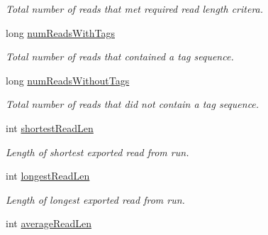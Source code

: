 \begin{DoxyCompactItemize}
\begin{DoxyCompactList}\small\item\em Total number of reads that met required read length critera. \end{DoxyCompactList}\item 
\hypertarget{structTorrentReadStatsBundle_a5f51b3facb0d61cb363f1a740a7a169c}{long \hyperlink{structTorrentReadStatsBundle_a5f51b3facb0d61cb363f1a740a7a169c}{num\-Reads\-With\-Tags}}\label{structTorrentReadStatsBundle_a5f51b3facb0d61cb363f1a740a7a169c}

\begin{DoxyCompactList}\small\item\em Total number of reads that contained a tag sequence. \end{DoxyCompactList}\item 
\hypertarget{structTorrentReadStatsBundle_a08e8566ad4ab2852637551655842ca6f}{long \hyperlink{structTorrentReadStatsBundle_a08e8566ad4ab2852637551655842ca6f}{num\-Reads\-Without\-Tags}}\label{structTorrentReadStatsBundle_a08e8566ad4ab2852637551655842ca6f}

\begin{DoxyCompactList}\small\item\em Total number of reads that did not contain a tag sequence. \end{DoxyCompactList}\item 
\hypertarget{structTorrentReadStatsBundle_a6107de9c288b56411433a8676e402867}{int \hyperlink{structTorrentReadStatsBundle_a6107de9c288b56411433a8676e402867}{shortest\-Read\-Len}}\label{structTorrentReadStatsBundle_a6107de9c288b56411433a8676e402867}

\begin{DoxyCompactList}\small\item\em Length of shortest exported read from run. \end{DoxyCompactList}\item 
\hypertarget{structTorrentReadStatsBundle_a948ede5638d944ec273ffbe580906c1c}{int \hyperlink{structTorrentReadStatsBundle_a948ede5638d944ec273ffbe580906c1c}{longest\-Read\-Len}}\label{structTorrentReadStatsBundle_a948ede5638d944ec273ffbe580906c1c}

\begin{DoxyCompactList}\small\item\em Length of longest exported read from run. \end{DoxyCompactList}\item 
\hypertarget{structTorrentReadStatsBundle_a10543cd8c069570cab75dab13e8ccc00}{int \hyperlink{structTorrentReadStatsBundle_a10543cd8c069570cab75dab13e8ccc00}{average\-Read\-Len}}\label{structTorrentReadStatsBundle_a10543cd8c069570cab75dab13e8ccc00}


\end{DoxyCompactItemize}
